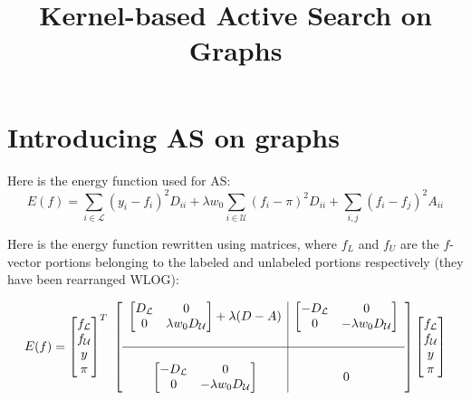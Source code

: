 \documentclass[12pt]{article}
\title{Kernel-based Active Search on Graphs}
\date{\vspace{-10ex}}
\renewcommand{\L}{\mathcal{L}}
\newcommand{\U}{\mathcal{U}}
\begin{document}
	\maketitle

	\section{Introducing AS on graphs}

		Here is the energy function used for AS:
		\begin{equation}
			E(f) = \sum\limits_{i \in \L} (y_i-f_i)^2 D_{ii} + \lambda w_0 \sum\limits_{i \in \U} (f_i-\pi)^2 D_{ii} + \sum\limits_{i,j} (f_i-f_j)^2 A_{ii}
		\end{equation}

		Here is the energy function rewritten using matrices, where $f_L$ and $f_U$ are the $f$-vector portions belonging to the labeled and unlabeled portions respectively (they have been rearranged WLOG):

		$$E(f) = \left[\begin{matrix} f_\L \\ f_\U \\ y \\ \pi \end{matrix}\right]^T \
				 \left[\begin{array}{c|c}
				 	\left[\begin{matrix} D_\L & 0 \\ 0&\lambda w_0 D_\U\end{matrix}\right] + \lambda(D-A) & 
				 	\left[\begin{matrix} -D_\L & 0 \\ 0&-\lambda w_0 D_\U\end{matrix}\right] 
				 	\\\\ \hline \\ 
				 	\left[\begin{matrix} -D_\L & 0 \\ 0&-\lambda w_0 D_\U\end{matrix}\right] & 
				 	0
				 	\end{array}\right] 
				 \left[\begin{matrix} f_\L \\ f_\U \\ y \\ \pi \end{matrix}\right]
		$$
\end{document}
